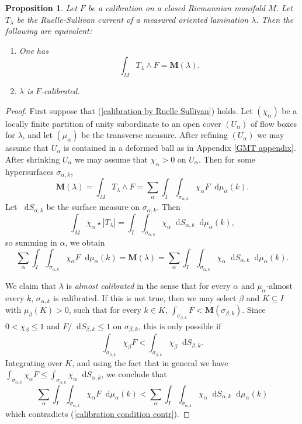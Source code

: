 \documentclass[reqno,11pt]{amsart}
\newcommand*\dif{\mathop{}\!\mathrm{d}}
\newcommand{\Mass}{\mathbf M}
\newcommand{\dfn}[1]{\emph{#1}\index{#1}}
\newtheorem{proposition}[theorem]{Proposition}
\theoremstyle{definition}
\numberwithin{equation}{section}
\begin{document}
\begin{proposition}\label{calibration condition}
Let $F$ be a calibration on a closed Riemannian manifold $M$.
Let $T_\lambda$ be the Ruelle-Sullivan current of a measured oriented lamination $\lambda$.
Then the following are equivalent:
\begin{enumerate}
\item One has \begin{equation}\label{calibration by Ruelle Sullivan}
\int_M T_\lambda \wedge F = \Mass(\lambda).
\end{equation}
\item $\lambda$ is $F$-calibrated.
\end{enumerate}
\end{proposition}
\begin{proof}
First suppose that (\ref{calibration by Ruelle Sullivan}) holds.
Let $(\chi_\alpha)$ be a locally finite partition of unity subordinate to an open cover $(U_\alpha)$ of flow boxes for $\lambda$, and let $(\mu_\alpha)$ be the transverse measure.
After refining $(U_\alpha)$ we may assume that $U_\alpha$ is contained in a deformed ball as in Appendix \ref{GMT appendix}. After shrinking $U_\alpha$ we may assume that $\chi_\alpha > 0$ on $U_\alpha$.
Then for some hypersurfaces $\sigma_{\alpha,k}$,
$$\Mass(\lambda) = \int_M T_\lambda \wedge F = \sum_\alpha \int_I \int_{\sigma_{\alpha,k}} \chi_\alpha F \dif \mu_\alpha(k).$$
Let $\dif S_{\alpha,k}$ be the surface measure on $\sigma_{\alpha,k}$.
Then
$$\int_M \chi_\alpha \star |T_\lambda| = \int_I \int_{\sigma_{\alpha,k}} \chi_\alpha \dif S_{\alpha,k} \dif \mu_\alpha(k),$$
so summing in $\alpha$, we obtain 
\begin{equation}\label{calibration condition contr}
\sum_\alpha \int_I \int_{\sigma_{\alpha,k}} \chi_\alpha F \dif \mu_\alpha(k) = \Mass(\lambda) = \sum_\alpha \int_I \int_{\sigma_{\alpha,k}} \chi_\alpha \dif S_{\alpha,k} \dif \mu_\alpha(k).
\end{equation}

We claim that $\lambda$ is \dfn{almost calibrated} in the sense that for every $\alpha$ and $\mu_\alpha$-almost every $k$, $\sigma_{\alpha, k}$ is calibrated.
If this is not true, then we may select $\beta$ and $K \subseteq I$ with $\mu_\beta(K) > 0$, such that for every $k \in K$, $\int_{\sigma_{\beta, k}} F < \Mass(\sigma_{\beta, k})$.
Since $0 < \chi_\beta \leq 1$ and $F/\dif S_{\beta, k} \leq 1$ on $\sigma_{\beta, k}$, this is only possible if 
$$\int_{\sigma_{\beta, k}} \chi_\beta F < \int_{\sigma_{\beta, k}} \chi_\beta \dif S_{\beta, k}.$$
Integrating over $K$, and using the fact that in general we have $\int_{\sigma_{\alpha, k}} \chi_\alpha F \leq \int_{\sigma_{\alpha, k}} \chi_\alpha \dif S_{\alpha, k}$, we conclude that 
$$\sum_\alpha \int_I \int_{\sigma_{\alpha, k}} \chi_\alpha F \dif \mu_\alpha(k) < \sum_\alpha \int_I \int_{\sigma_{\alpha, k}} \chi_\alpha \dif S_{\alpha, k} \dif \mu_\alpha(k)$$
which contradicts (\ref{calibration condition contr}).


\end{proof}
\end{document}
